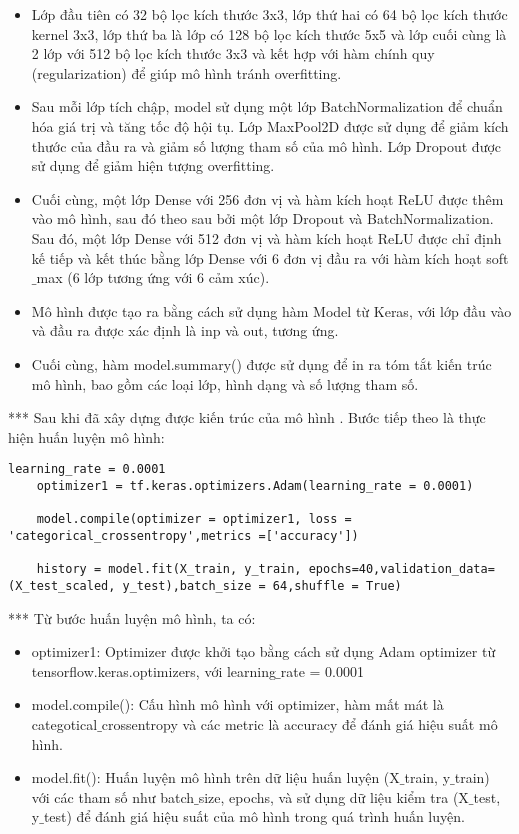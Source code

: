 \begin{itemize}
	\item Lớp đầu tiên có 32 bộ lọc kích thước 3x3, lớp thứ hai có 64 bộ lọc kích thước kernel 3x3, lớp thứ ba là lớp có 128 bộ lọc  kích thước 5x5 và lớp cuối cùng là 2 lớp với 512 bộ lọc kích thước 3x3 và kết hợp với hàm chính quy (regularization) để giúp mô hình tránh overfitting.
	
	\item Sau mỗi lớp tích chập, model sử dụng một lớp BatchNormalization để chuẩn hóa giá trị và tăng tốc độ hội tụ. Lớp MaxPool2D được sử dụng để giảm kích thước của đầu ra và giảm số lượng tham số của mô hình. Lớp Dropout được sử dụng để giảm hiện tượng overfitting.
	
	\item Cuối cùng, một lớp Dense với 256 đơn vị và hàm kích hoạt ReLU được thêm vào mô hình, sau đó theo sau bởi một lớp Dropout và BatchNormalization. Sau đó, một lớp Dense với 512 đơn vị và hàm kích hoạt ReLU được chỉ định kế tiếp và kết thúc bằng lớp Dense với 6 đơn vị đầu ra với hàm kích hoạt soft$\_$max (6 lớp tương ứng với 6 cảm xúc).
	\item Mô hình được tạo ra bằng cách sử dụng hàm Model từ Keras, với lớp đầu vào và đầu ra được xác định là inp và out, tương ứng.
	
	\item Cuối cùng, hàm model.summary() được sử dụng để in ra tóm tắt kiến trúc mô hình, bao gồm các loại lớp, hình dạng và số lượng tham số.
\end{itemize}

*** Sau khi đã xây dựng được kiến trúc của mô hình . Bước tiếp theo là thực hiện huấn luyện mô hình: 

\begin{lstlisting}[style=codePython]
	learning_rate = 0.0001
	optimizer1 = tf.keras.optimizers.Adam(learning_rate = 0.0001)
	
	model.compile(optimizer = optimizer1, loss = 'categorical_crossentropy',metrics =['accuracy'])
	
	history = model.fit(X_train, y_train, epochs=40,validation_data=(X_test_scaled, y_test),batch_size = 64,shuffle = True)					
\end{lstlisting}

*** Từ bước huấn luyện mô hình, ta có: 

\begin{itemize}
	\item optimizer1: Optimizer được khởi tạo bằng cách sử dụng Adam optimizer từ tensorflow.keras.optimizers, với learning$\_$rate = 0.0001
	
	\item model.compile(): Cấu hình mô hình với optimizer, hàm mất mát là categotical$\_$crossentropy và các metric là accuracy để đánh giá hiệu suất mô hình.
	
	\item model.fit(): Huấn luyện mô hình trên dữ liệu huấn luyện (X$\_$train, y$\_$train) với các tham số như batch$\_$size, epochs, và sử dụng dữ liệu kiểm tra (X$\_$test, y$\_$test) để đánh giá hiệu suất của mô hình trong quá trình huấn luyện.
\end{itemize}

